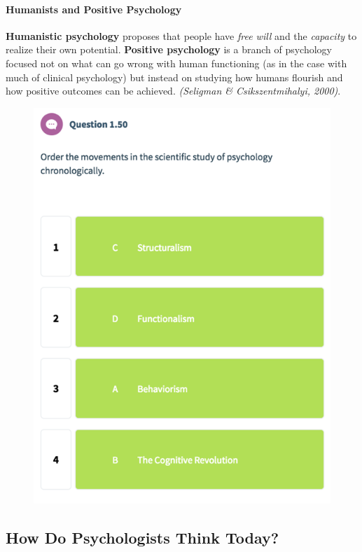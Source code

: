 \documentclass{article}
\begin{document}
 	\paragraph{Humanists and Positive Psychology} \quad
 		\newline \textbf{Humanistic psychology} proposes that people have \emph{free will} and the \emph{capacity} to realize their own potential.
 		\newline \textbf{Positive psychology} is a branch of psychology focused not on what can go wrong with human functioning (as in the case with much of clinical psychology) but instead on studying how humans flourish and how positive outcomes can be achieved. \emph{(Seligman \& Csikszentmihalyi, 2000)}.
 	\begin{figure}[H]
 		\centering
 		\includegraphics{psy100/0150}	
 	\end{figure}

 	\subsection{How Do Psychologists Think Today?}
\end{document}
